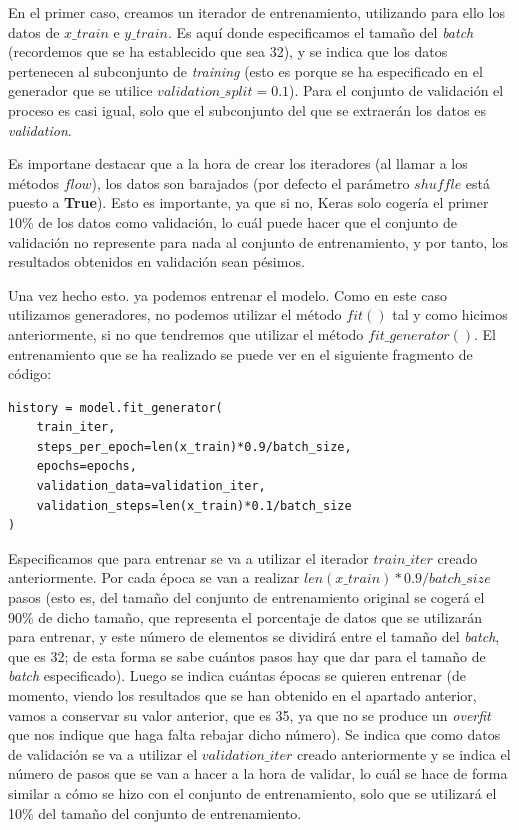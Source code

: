 \documentclass[11pt,a4paper]{article}
\begin{document}
En el primer caso, creamos un iterador de entrenamiento, utilizando para ello los datos de $x\_train$ e $y\_train$. Es aquí
donde especificamos el tamaño del \textit{batch} (recordemos que se ha establecido que sea 32), y se indica que los datos
pertenecen al subconjunto de \textit{training} (esto es porque se ha especificado en el generador que se utilice
$validation\_split = 0.1$). Para el conjunto de validación el proceso es casi igual, solo que el subconjunto del que
se extraerán los datos es \textit{validation}.

Es importane destacar que a la hora de crear los iteradores (al llamar a los métodos $flow$), los
datos son barajados (por defecto el parámetro $shuffle$ está puesto a \textbf{True}). Esto es importante, ya que si no,
Keras solo cogería el primer 10\% de los datos como validación, lo cuál puede hacer que el conjunto de validación no represente
para nada al conjunto de entrenamiento, y por tanto, los resultados obtenidos en validación sean pésimos.

Una vez hecho esto. ya podemos entrenar el modelo. Como en este caso utilizamos generadores, no podemos utilizar el
método $fit()$ tal y como hicimos anteriormente, si no que tendremos que utilizar el método $fit\_generator()$. El entrenamiento
que se ha realizado se puede ver en el siguiente fragmento de código:

\begin{lstlisting}
history = model.fit_generator(
    train_iter,
    steps_per_epoch=len(x_train)*0.9/batch_size,
    epochs=epochs,
    validation_data=validation_iter,
    validation_steps=len(x_train)*0.1/batch_size
)
\end{lstlisting}

Especificamos que para entrenar se va a utilizar el iterador $train\_iter$ creado anteriormente. Por cada época se van a
realizar $len(x\_train)*0.9/batch\_size$ pasos (esto es, del tamaño del conjunto de entrenamiento original se cogerá el
90\% de dicho tamaño, que representa el porcentaje de datos que se utilizarán para entrenar, y este número de elementos
se dividirá entre el tamaño del \textit{batch}, que es 32; de esta forma se sabe cuántos pasos hay que dar para el tamaño de
\textit{batch} especificado). Luego se indica cuántas épocas se quieren entrenar (de momento, viendo los resultados que se han
obtenido en el apartado anterior, vamos a conservar su valor anterior, que es 35, ya que no se produce un \textit{overfit} que
nos indique que haga falta rebajar dicho número). Se indica que como datos de validación se va a utilizar el $validation\_iter$
creado anteriormente y se indica el número de pasos que se van a hacer a la hora de validar, lo cuál se hace de forma similar
a cómo se hizo con el conjunto de entrenamiento, solo que se utilizará el 10\% del tamaño del conjunto de entrenamiento.
\end{document}
